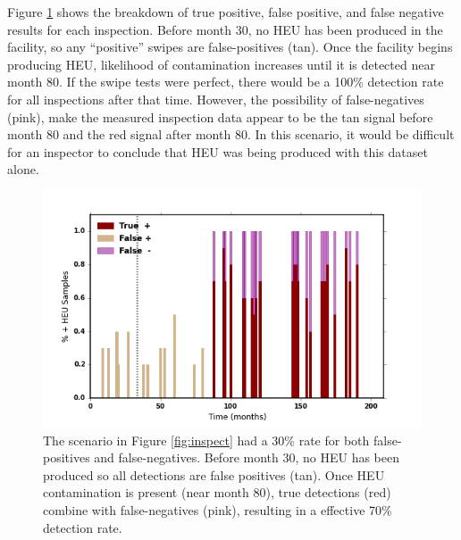 Figure \ref{fig:false_inspect} shows the breakdown of true positive, false positive, and false negative results for each inspection.  Before month 30, no \gls{HEU} has been produced in the facility, so any ``positive'' swipes are false-positives (tan). Once the facility begins producing \gls{HEU}, likelihood of contamination increases until it is detected near month 80. If the swipe tests were perfect, there would be a 100\% detection rate for all inspections after that time. However, the possibility of false-negatives (pink), make the measured inspection data appear to be the tan signal before month 80 and the red signal after month 80.  In this scenario, it would be difficult for an inspector to conclude that \gls{HEU} was being produced with this dataset alone.

\begin{figure}%
\begin{center}
\includegraphics[natwidth=162bp,natheight=227bp, scale=0.6]{./figs/mm_5enrich_tinytails_inspswipe_rates.png}
\end{center}
\caption{The scenario in Figure \ref{fig:inspect} had a 30\% rate for both false-positives and false-negatives. Before month 30, no HEU has been produced so all detections are false positives (tan). Once \gls{HEU} contamination is present (near month 80), true detections (red) combine with false-negatives (pink), resulting in a effective 70\% detection rate.}
\label{fig:false_inspect}
\end{figure}
